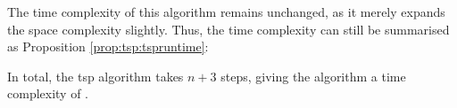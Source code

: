 The time complexity of this algorithm remains unchanged, as it merely expands the space complexity slightly.  Thus, the time complexity can still be summarised as Proposition \ref{prop:tsp:tspruntime}:

\begin{proposition}
In total, the \gls{tsp} algorithm takes \(n + 3\) steps, giving the algorithm a time complexity of .
\label{prop:tsp:tspruntime}
\end{proposition}